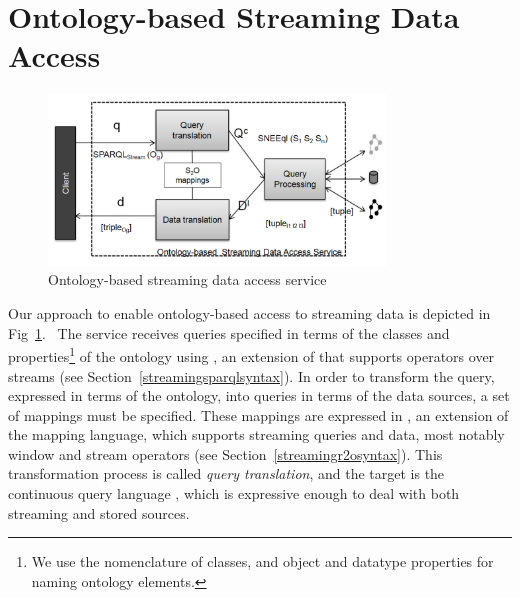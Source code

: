 \section{Ontology-based Streaming Data Access}
\label{approach}



\begin{figure}[t]
  \centering
  \includegraphics[width=0.8\textwidth]{img/approachImg}
  \caption{Ontology-based streaming data access service}
  \label{fig:SemanticIntegrator}
\end{figure}

Our approach to enable ontology-based access to streaming data is depicted in Fig~\ref{fig:SemanticIntegrator}.\ %
The service receives queries specified in terms of the classes and properties\footnote{We use the \owl nomenclature of classes, and object and datatype properties for naming ontology elements.} of the ontology using \sparqlstr, an extension of \sparql that supports operators over \rdf streams (see Section~\ref{streamingsparqlsyntax}).
In order to transform the \sparqlstr query, expressed in terms of the ontology, into queries in terms of the data sources, a set of mappings must be specified.
These mappings are expressed in \stwoo, an extension of the \rtwoo mapping language, which supports streaming queries and data, most notably window and stream operators (see Section~\ref{streamingr2osyntax}).
This transformation process is called \textit{query translation}, and the target is the continuous query language \sneeql, which is expressive enough to deal with both streaming and stored sources.

